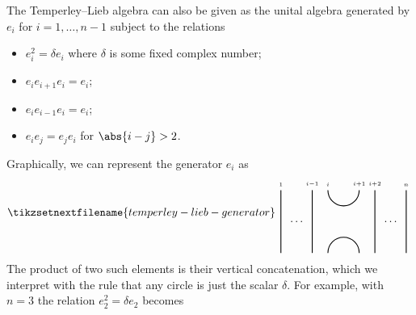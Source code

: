 \documentclass[fleqn]{NotesClass}
\begin{document}
    The Temperley--Lieb algebra can also be given as the unital algebra generated by \(e_i\) for \(i = 1, \dotsc, n-1\) subject to the relations
    \begin{itemize}
        \item \(e_i^2 = \delta e_i\) where \(\delta\) is some fixed complex number;
        \item \(e_ie_{i+1}e_i = e_i\);
        \item \(e_ie_{i-1}e_i = e_i\);
        \item \(e_ie_j = e_je_i\) for \(\abs{i - j} > 2\).
    \end{itemize}
    Graphically, we can represent the generator \(e_i\) as
    \begin{equation}
        \tikzsetnextfilename{temperley-lieb-generator}
        \begin{tikzpicture}[baseline=(current bounding box)]
            \draw [thick] (0, 0) -- ++ (0, -2);
            \draw [thick] (1, 0) -- ++ (0, -2);
            \draw [thick] (1.5, 0) arc (180:360:0.5);
            \draw [thick] (1.5, -2) arc (180:0:0.5);
            \draw [thick] (3, 0) -- ++ (0, -2);
            \draw [thick] (4, 0) -- ++ (0, -2);
            \node at (0.5, -1) {\(\dots\)};
            \node at (3.5, -1) {\(\dots\)};
            \node [above] at (0, 0) {\(\scriptscriptstyle 1\)};
            \node [above] at (1, 0) {\(\scriptscriptstyle i-1\)};
            \node [above] at (1.5, 0) {\(\scriptscriptstyle i\)};
            \node [above] at (2.5, 0) {\(\scriptscriptstyle i+1\)};
            \node [above] at (3, 0) {\(\scriptscriptstyle i+2\)};
            \node [above] at (4, 0) {\(\scriptscriptstyle n\)};
        \end{tikzpicture}
    \end{equation}
    The product of two such elements is their vertical concatenation, which we interpret with the rule that any circle is just the scalar \(\delta\).
    For example, with \(n = 3\) the relation \(e_2^2 = \delta e_2\) becomes
\end{document}
